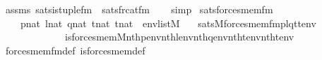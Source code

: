 \begin{isabellebody}
\ assms\ sats{\isacharunderscore}{\kern0pt}is{\isacharunderscore}{\kern0pt}tuple{\isacharunderscore}{\kern0pt}fm\ \ sats{\isacharunderscore}{\kern0pt}frc{\isacharunderscore}{\kern0pt}at{\isacharunderscore}{\kern0pt}fm\isanewline
\ \ \isamarkupfalse%
\ simp%
\endisatagproof
{\isafoldproof}%
%
\isadelimproof
\isanewline
%
\endisadelimproof
\isanewline
{}\isamarkupfalse%
\ sats{\isacharunderscore}{\kern0pt}forces{\isacharunderscore}{\kern0pt}mem{\isacharprime}{\kern0pt}{\isacharunderscore}{\kern0pt}fm{\isacharcolon}{\kern0pt}\isanewline
\ \ \ \ {\isachardoublequoteopen}p{\isasymin}nat{\isachardoublequoteclose}\ {\isachardoublequoteopen}l{\isasymin}nat{\isachardoublequoteclose}\ {\isachardoublequoteopen}q{\isasymin}nat{\isachardoublequoteclose}\ {\isachardoublequoteopen}t{}{\isasymin}nat{\isachardoublequoteclose}\ {\isachardoublequoteopen}t{}{\isasymin}nat{\isachardoublequoteclose}\ \ {\isachardoublequoteopen}env{\isasymin}list{\isacharparenleft}{\kern0pt}M{\isacharparenright}{\kern0pt}{\isachardoublequoteclose}\isanewline
\ \ \ {\isachardoublequoteopen}sats{\isacharparenleft}{\kern0pt}M{\isacharcomma}{\kern0pt}forces{\isacharunderscore}{\kern0pt}mem{\isacharunderscore}{\kern0pt}fm{\isacharparenleft}{\kern0pt}p{\isacharcomma}{\kern0pt}l{\isacharcomma}{\kern0pt}q{\isacharcomma}{\kern0pt}t{}{\isacharcomma}{\kern0pt}t{}{\isacharparenright}{\kern0pt}{\isacharcomma}{\kern0pt}env{\isacharparenright}{\kern0pt}\ {\isasymlongleftrightarrow}\isanewline
\ \ \ \ \ \ \ \ \ \ \ \ \ is{\isacharunderscore}{\kern0pt}forces{\isacharunderscore}{\kern0pt}mem{\isacharprime}{\kern0pt}{\isacharparenleft}{\kern0pt}{\isacharhash}{\kern0pt}{\isacharhash}{\kern0pt}M{\isacharcomma}{\kern0pt}nth{\isacharparenleft}{\kern0pt}p{\isacharcomma}{\kern0pt}env{\isacharparenright}{\kern0pt}{\isacharcomma}{\kern0pt}nth{\isacharparenleft}{\kern0pt}l{\isacharcomma}{\kern0pt}env{\isacharparenright}{\kern0pt}{\isacharcomma}{\kern0pt}nth{\isacharparenleft}{\kern0pt}q{\isacharcomma}{\kern0pt}env{\isacharparenright}{\kern0pt}{\isacharcomma}{\kern0pt}nth{\isacharparenleft}{\kern0pt}t{}{\isacharcomma}{\kern0pt}env{\isacharparenright}{\kern0pt}{\isacharcomma}{\kern0pt}nth{\isacharparenleft}{\kern0pt}t{}{\isacharcomma}{\kern0pt}env{\isacharparenright}{\kern0pt}{\isacharparenright}{\kern0pt}{\isachardoublequoteclose}\isanewline
%
\isadelimproof
\ \ %
\endisadelimproof
%
\isatagproof
{}\isamarkupfalse%
\ forces{\isacharunderscore}{\kern0pt}mem{\isacharunderscore}{\kern0pt}fm{\isacharunderscore}{\kern0pt}def\ is{\isacharunderscore}{\kern0pt}forces{\isacharunderscore}{\kern0pt}mem{\isacharprime}{\kern0pt}{\isacharunderscore}{\kern0pt}def\ \isamarkupfalse%

\end{isabellebody}
